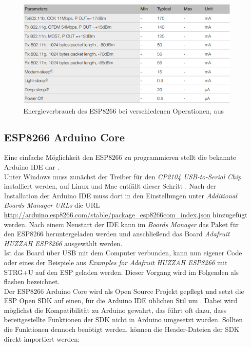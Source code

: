 \begin{figure}[h]
  \centering
	\includegraphics[width=\textwidth]{images/esppower.png}
  \caption{Energieverbrauch des ESP8266 bei verschiedenen Operationen, aus \cite{espressif2017esp8266}}
  \label{fig:esppower}
\end{figure}


\subsection{ESP8266 Arduino Core}
Eine einfache Möglichkeit den ESP8266 zu programmieren stellt die bekannte Arduino IDE dar \cite{banzi2017arduino}.\\
Unter Windows muss zunächst der Treiber für den \textit{CP2104 USB-to-Serial Chip} installiert werden, auf Linux und Mac entfällt dieser Schritt \cite{fried2017feather}.
Nach der Installation der Arduino IDE muss dort in den Einstellungen unter \textit{Additional Boards Manager URLs} die URL \url{http://arduino.esp8266.com/stable/package_esp8266com_index.json} hinzugefügt werden.  
Nach einem Neustart der IDE kann im \textit{Boards Manager} das Paket für den ESP8266 heruntergeladen werden und anschließend das Board \textit{Adafruit HUZZAH ESP8266} ausgewählt werden. \\
Ist das Board über USB mit dem Computer verbunden, kann nun eigener Code oder eines der Beispiele aus \textit{Examples for Adafruit HUZZAH ESP8266} mit STRG+U auf den ESP geladen werden. 
Dieser Vorgang wird im Folgenden als flashen bezeichnet. \\
Der ESP8266 Arduino Core wird als Open Source Projekt gepflegt und setzt die ESP Open SDK auf einen, für die Arduino IDE üblichen Stil um \cite{arduino2017core}. 
Dabei wird möglichst die Kompatibilität zu Arduino gewahrt, das führt oft dazu, dass bereitgestellte Funktionen der SDK nicht in Arduino umgesetzt wurden.
Sollten die Funktionen dennoch benötigt werden, können die Header-Dateien der SDK direkt importiert werden:


